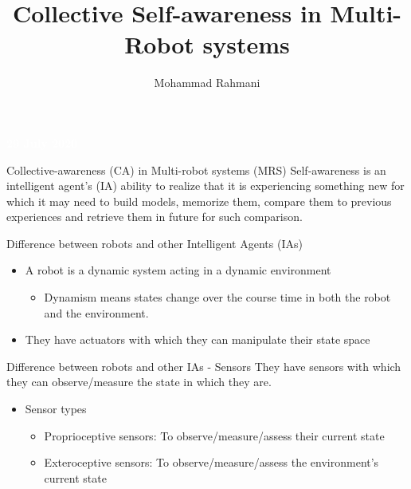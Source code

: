 \documentclass[unknownkeysallowed]{beamer}
\title{Collective Self-awareness in Multi-Robot systems}
\author{Mohammad Rahmani}
\institute{DECIDE Doctoral School}
\begin{document}
	\begin{frame}
		\date{}
		\maketitle
		\textcolor{white}{\textbf{29 July 2020}}
	\end{frame}
	
	\begin{frame}{Collective-awareness (CA) in Multi-robot systems (MRS)}
		Self-awareness is an intelligent agent's (IA) ability to realize that it is experiencing something new for which it may need to build models, memorize them, compare them to previous experiences and retrieve them in future for such comparison.  
	\end{frame}

	\begin{frame}{Difference between robots and other Intelligent Agents (IAs)}
		 \begin{itemize}
		 	\item A robot is a dynamic system acting in a dynamic environment
		 		\begin{itemize}
		 			\item Dynamism means states change over the course time in both the robot and the environment.
		 		\end{itemize}
	 		\item They have actuators with which they can manipulate their state space 
		 \end{itemize}
	\end{frame}

	\begin{frame}{Difference between robots and other IAs - Sensors}
		They have sensors with which they can observe/measure the state in which they are. 
		\begin{itemize}
			\item Sensor types
			\begin{itemize}
				\item Proprioceptive sensors: To observe/measure/assess their current state
				\item Exteroceptive sensors: To observe/measure/assess the environment's current state
			\end{itemize}
		\end{itemize}
	\end{frame}
\end{document}
